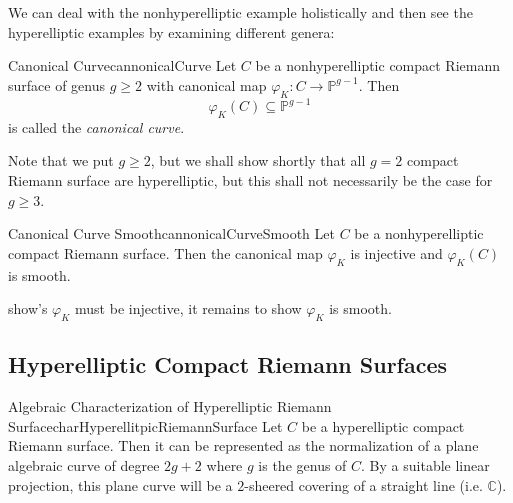\documentclass{book}
\newcommand{\C}{{\mathbb{C}}}
\renewcommand{\P}{{\mathbb{P}}}
\newcommand{\sse}{\subseteq}
\let\temp\phi
\let\phi\varphi
\let\varphi\temp
\begin{document}
We can deal with the nonhyperelliptic example holistically and then see the hyperelliptic examples by
examining different genera:

\begin{defn}{Canonical Curve}{cannonicalCurve}
  Let $C$ be a nonhyperelliptic compact Riemann surface of genus $g \ge 2$ with canonical map $\phi_K:
  C \to \P^{g-1}$. Then
  \[
    \phi_K(C) \sse \P^{g-1}
  \]
  is called the \emph{canonical curve}.
\end{defn}
Note that we put $g\ge 2$, but we shall show shortly that all $g= 2$ compact Riemann surface are
hyperelliptic, but this shall not necessarily be the case for $g\ge 3$.

\begin{prop}{Canonical Curve Smooth}{cannonicalCurveSmooth}
  Let $C$ be a nonhyperelliptic compact Riemann surface. Then the canonical map $\phi_K$ is injective and
  $\phi_K(C)$ is smooth.
\end{prop}

\begin{Proof}
   show's $\phi_K$ must be injective, it remains to show $\phi_K$ is
  smooth.

  \cite[p.136]{a.griffithsIntroductionAlgebraicCurves}
\end{Proof}


\subsection{Hyperelliptic Compact Riemann Surfaces}\label{sec:hyperellipticCompactRiemannSurface}

\begin{prop}{Algebraic Characterization of Hyperelliptic Riemann Surface}{charHyperellitpicRiemannSurface}
  Let $C$ be a hyperelliptic compact Riemann surface. Then it can be represented as the normalization of
  a plane algebraic curve of degree $2g+2$ where $g$ is the genus of $C$. By a suitable linear projection,
  this plane curve will be a $2$-sheered covering of a straight line (i.e. $\C$).
\end{prop}
\end{document}
